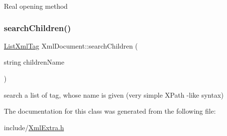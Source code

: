 Real opening method \mbox{\label{classXmlDocument_a79bce84756484b2026ee7fd15ba61b08}} 
\subsubsection{\texorpdfstring{search\+Children()}{searchChildren()}}
{\footnotesize\ttfamily \hyperlink{XmlExtra_8h_ade6a1aa0dc76b2c26a120f5c2f10ff7d}{List\+Xml\+Tag} Xml\+Document\+::search\+Children (\begin{DoxyParamCaption}\item[{string}]{children\+Name }\end{DoxyParamCaption})}

search a list of tag, whose name is given (very simple X\+Path -\/like syntax) 

The documentation for this class was generated from the following file\+:\begin{DoxyCompactItemize}
\item 
include/\hyperlink{XmlExtra_8h}{Xml\+Extra.\+h}\end{DoxyCompactItemize}
